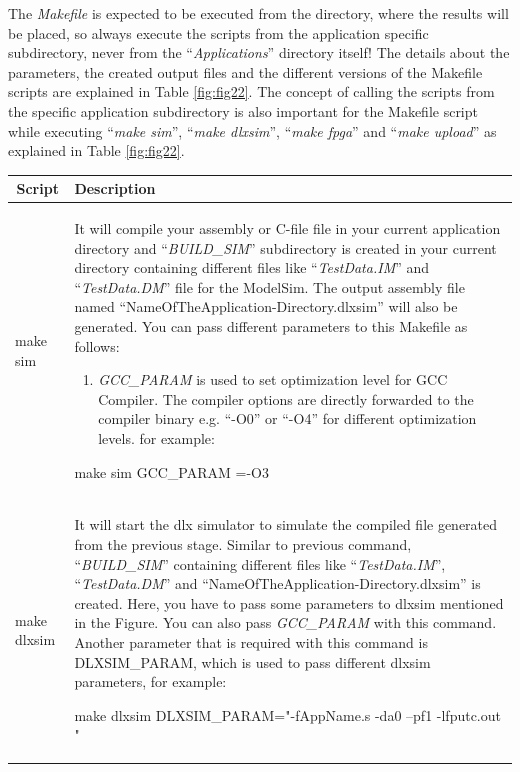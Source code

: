 The \emph{Makefile} is expected to be executed from the directory, where
the results will be placed, so always execute the scripts from the
application specific subdirectory, never from the
``\emph{Applications}'' directory itself! The details about the
parameters, the created output files and the different versions of the
Makefile scripts are explained in Table \ref{fig:fig22}.
The concept of calling the scripts from the specific application
subdirectory is also important for the Makefile script while executing
``\emph{make sim}'', ``\emph{make dlxsim}'', ``\emph{make fpga}'' and
``\emph{make upload}'' as explained in Table \ref{fig:fig22}.
\begin{table}[!htb]
	\centering
	\begin{tabular}{|l|p{13cm}|}
		\hline
		\multicolumn{1}{|c|}{\textbf{Script}} & \textbf{Description}                                                               \\ \hline
		make sim 
		& It will compile your assembly or C-file file in your current application
		directory and ``\emph{BUILD\_SIM}'' subdirectory is created in your
		current directory containing different files like ``\emph{TestData.IM}''
		and ``\emph{TestData.DM}'' file for the ModelSim. The output assembly
		file named ``NameOfTheApplication-Directory.dlxsim'' will also be
		generated. You can pass different parameters to this Makefile as
		follows:
		\begin{enumerate}
			\item
			\emph{GCC\_PARAM} is used to set optimization level for GCC Compiler.
			The compiler options are directly forwarded to the compiler binary
			e.g. ``-O0'' or ``-O4'' for different optimization levels. for
			example:
		\end{enumerate}
		make sim GCC\_PARAM =-O3\strut \\\hline
		make dlxsim      
		& It will start the dlx simulator to simulate the compiled file generated
		from the previous stage. Similar to previous command,
		``\emph{BUILD\_SIM}'' containing different files like
		``\emph{TestData.IM}'', ``\emph{TestData.DM}'' and
		``NameOfTheApplication-Directory.dlxsim'' is created. Here, you have to
		pass some parameters to dlxsim mentioned in the Figure. You can also
		pass \emph{GCC\_PARAM} with this command. Another parameter that is
		required with this command is DLXSIM\_PARAM, which is used to pass
		different dlxsim parameters, for example:
		
		make dlxsim DLXSIM\_PARAM="-fAppName.s -da0 --pf1 -lfputc.out "
		

\end{tabular}
\end{table}
